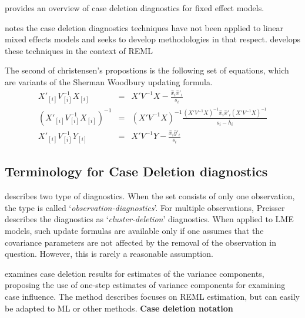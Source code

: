 \documentclass[12pt, a4paper]{report}
\theoremstyle{plain}
\theoremstyle{definition}
\theoremstyle{remark}
\begin{document}
	
	
	\citet{Christensen} provides an overview of case deletion
	diagnostics for fixed effect models.
	
	
	
	
	
	\citet{Christensen} notes the case deletion diagnostics techniques have not been applied to linear mixed effects models and seeks to develop methodologies in that respect. \citet{Christensen} develops these techniques in the context of REML
	
	
	
	The second of christensen's propostions is the following set of
	equations, which are variants of the Sherman Woodbury updating
	formula.
	\begin{eqnarray}
	X'_{[i]}V_{[i]}^{-1}X_{[i]} &=& X' V^{-1}X -
	\frac{\hat{x}_{i}\hat{x}'_{i}}{s_{i}}\\
	(X'_{[i]}V_{[i]}^{-1}X_{[i]})^{-1} &=& (X' V^{-1}X)^{-1} 
	\frac{(X' V^{-1}X)^{-1}\hat{x}_{i}\hat{x}' _{i}
		(X' V^{-1}X)^{-1}}{s_{i}- \bar{h}_{i}}\\
	X'_{[i]}V_{[i]}^{-1}Y_{[i]} &=& X\prime V^{-1}Y -
	\frac{\hat{x}_{i}\hat{y}' _{i}}{s_{i}}
	\end{eqnarray}
	
	
	\subsection{Terminology for Case Deletion diagnostics} %
	
	\citet{preisser} describes two type of diagnostics. When the set consists of only one observation, the type is called
	`\textit{observation-diagnostics}'. For multiple observations, Preisser describes the diagnostics as `\textit{cluster-deletion}' diagnostics. When applied to LME models, such update formulas are available only if one assumes that the covariance parameters are not affected by the removal of the observation in question. However, this is rarely a reasonable assumption.
	
	\citet{Christensen}examines case deletion results for estimates of
	the variance components, proposing the use of one-step estimates
	of variance components for examining case influence. The method
	describes focuses on REML estimation, but can easily be adapted to
	ML or other methods.
	\noindent \textbf{Case deletion notation} %
	
\end{document}
